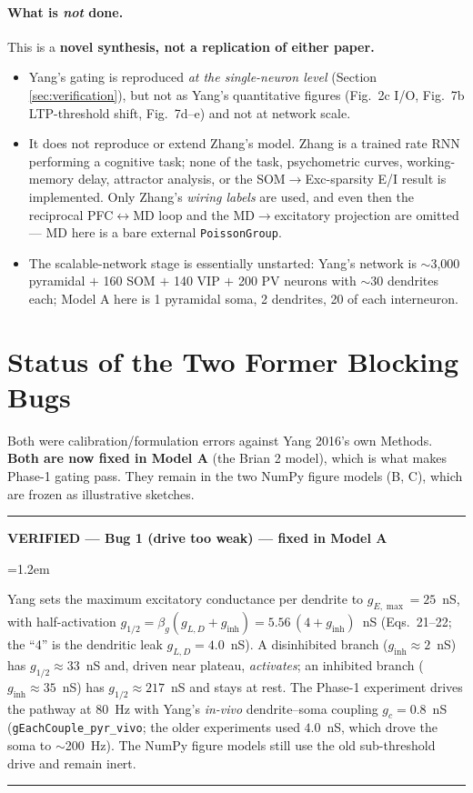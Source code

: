 \documentclass[11pt,a4paper]{article}
\newenvironment{okbox}[1]{%
  \par\medskip\noindent
  \textcolor{okgreen}{\rule{\linewidth}{1.1pt}}\par\nobreak\vspace{2pt}%
  \noindent\textcolor{okgreen}{\textbf{VERIFIED --- #1}}%
  \par\nobreak\vspace{3pt}%
  \begingroup\leftskip=1.2em\relax\small
}{%
  \par\endgroup\vspace{3pt}%
  \noindent\textcolor{okgreen}{\rule{\linewidth}{0.5pt}}\par\medskip
}
\begin{document}
\paragraph{What is \emph{not} done.}
This is a \textbf{novel synthesis, not a replication of either paper.}
\begin{itemize}
    \item Yang's gating is reproduced \emph{at the single-neuron level} (Section
      \ref{sec:verification}), but not as Yang's quantitative figures (Fig.~2c I/O,
      Fig.~7b LTP-threshold shift, Fig.~7d--e) and not at network scale.
    \item It does not reproduce or extend Zhang's model. Zhang is a trained rate RNN
      performing a cognitive task; none of the task, psychometric curves, working-memory
      delay, attractor analysis, or the SOM$\rightarrow$Exc-sparsity E/I result is
      implemented. Only Zhang's \emph{wiring labels} are used, and even then the
      reciprocal PFC$\leftrightarrow$MD loop and the MD$\rightarrow$excitatory projection
      are omitted --- MD here is a bare external \texttt{PoissonGroup}.
    \item The scalable-network stage is essentially unstarted: Yang's network is
      $\sim$3{,}000 pyramidal $+$ 160 SOM $+$ 140 VIP $+$ 200 PV neurons with $\sim$30
      dendrites each; Model A here is 1 pyramidal soma, 2 dendrites, 20 of each
      interneuron.
\end{itemize}

\section{Status of the Two Former Blocking Bugs}
\label{sec:bugs}
Both were calibration/formulation errors against Yang 2016's own Methods. \textbf{Both are
now fixed in Model A} (the Brian 2 model), which is what makes Phase-1 gating pass. They
remain in the two NumPy figure models (B, C), which are frozen as illustrative sketches.

\begin{okbox}{Bug 1 (drive too weak) --- fixed in Model A}
Yang sets the maximum excitatory conductance per dendrite to $g_{E,\max}=25$~nS, with
half-activation $g_{1/2}=\beta_g(g_{L,D}+g_{\text{inh}})=5.56\,(4+g_{\text{inh}})$~nS
(Eqs.~21--22; the ``4'' is the dendritic leak $g_{L,D}=4.0$~nS). A disinhibited branch
($g_{\text{inh}}\approx2$~nS) has $g_{1/2}\approx33$~nS and, driven near plateau,
\emph{activates}; an inhibited branch ($g_{\text{inh}}\approx35$~nS) has
$g_{1/2}\approx217$~nS and stays at rest. The Phase-1 experiment drives the pathway at
$80$~Hz with Yang's \emph{in-vivo} dendrite--soma coupling $g_c=0.8$~nS
(\texttt{gEachCouple\_pyr\_vivo}; the older experiments used $4.0$~nS, which drove the soma
to $\sim$200~Hz). The NumPy figure models still use the old sub-threshold drive and remain
inert.
\end{okbox}
\end{document}
